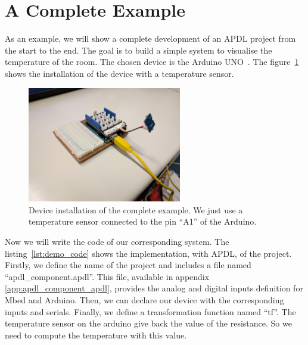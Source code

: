 \section{A Complete Example}
\label{sec:a_complete_example}

As an example, we will show a complete development of an APDL project from the
start to the end. The goal is to build a simple system to visualise the
temperature of the room. The chosen device is the Arduino
UNO~\cite{Store2014}. The figure~\ref{fig:demo_device} shows the installation of
the device with a temperature sensor.

\begin{figure}[ht]
  \centering
  \includegraphics[width=0.60\textwidth]{img/demo_device}
  \caption[Device instalation of the complete example]{Device installation of
    the complete example. We just use a temperature sensor connected to the pin
    ``A1'' of the Arduino.}
  \label{fig:demo_device} 
\end{figure}

Now we will write the code of our corresponding system. The
listing~\ref{lst:demo_code} shows the implementation, with APDL, of the project.
Firstly, we define the name of the project and includes a file named
``apdl\_component.apdl''. This file, available in appendix
\ref{app:apdl_component_apdl}, provides the analog and digital inputs definition
for Mbed and Arduino. Then, we can declare our device with the corresponding
inputs and serials. Finally, we define a transformation function named ``tf''.
The temperature sensor on the arduino give back the value of the resistance. So
we need to compute the temperature with this value.

